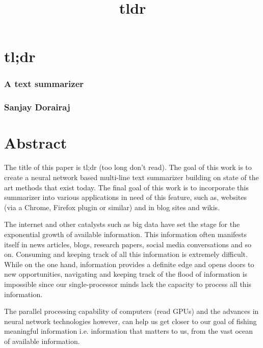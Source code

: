 \documentclass[11pt]{article}
\title{tldr}
\begin{document}
    
    
    \maketitle
    
    

    
    \section{tl;dr}\label{tldr}

\subsubsection{A text summarizer}\label{a-text-summarizer}

\subsubsection{Sanjay Dorairaj}\label{sanjay-dorairaj}

    \section{Abstract}\label{abstract}

The title of this paper is tl;dr (too long don't read). The goal of this
work is to create a neural network based multi-line text summarizer
building on state of the art methods that exist today. The final goal of
this work is to incorporate this summarizer into various applications in
need of this feature, such as, websites (via a Chrome, Firefox plugin or
similar) and in blog sites and wikis.

The internet and other catalysts such as big data have set the stage for
the exponential growth of available information. This information often
manifests itself in news articles, blogs, research papers, social media
conversations and so on. Consuming and keeping track of all this
information is extremely difficult. While on the one hand, information
provides a definite edge and opens doors to new opportunities,
navigating and keeping track of the flood of information is impossible
since our single-processor minds lack the capacity to process all this
information.

The parallel processing capability of computers (read GPUs) and the
advances in neural network technologies however, can help us get closer
to our goal of fishing meaningful information i.e. information that
matters to us, from the vast ocean of available information.
\end{document}
